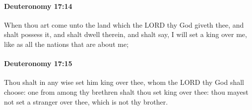 		\paragraph{Deuteronomy 17:14} %
			\label{DEUTERONOMY-17-14}

			When thou art come unto the land which the LORD thy God giveth thee, and shalt possess it, and shalt dwell therein, and shalt say, I will set a king over me, like as all the nations that are about me;


		\paragraph{Deuteronomy 17:15} %
			\label{DEUTERONOMY-17-15}

			Thou shalt in any wise set him king over thee, whom the LORD thy God shall choose: one from among thy brethren shalt thou set king over thee: thou mayest not set a stranger over thee, which is not thy brother.

